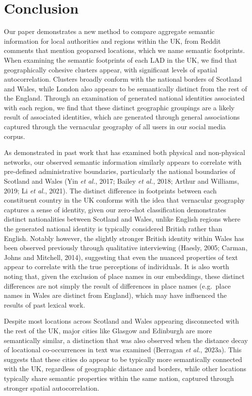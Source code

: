 \documentclass[
  letterpaper,
  11pt,
  english,
  onehalfspacing,
  headsepline]{MastersDoctoralThesis}
\begin{document}
\hypertarget{sec-footconclusion}{%
\section{Conclusion}\label{sec-footconclusion}}

Our paper demonstrates a new method to compare aggregate semantic
information for local authorities and regions within the UK, from Reddit
comments that mention geoparsed locations, which we name semantic
footprints. When examining the semantic footprints of each LAD in the
UK, we find that geographically cohesive clusters appear, with
significant levels of spatial autocorrelation. Clusters broadly conform
with the national borders of Scotland and Wales, while London also
appears to be semantically distinct from the rest of the England.
Through an examination of generated national identities associated with
each region, we find that these distinct geographic groupings are a
likely result of associated identities, which are generated through
general associations captured through the vernacular geography of all
users in our social media corpus.

As demonstrated in past work that has examined both physical and
non-physical networks, our observed semantic information similarly
appears to correlate with pre-defined administrative boundaries,
particularly the national boundaries of Scotland and Wales (Yin \emph{et
al.}, 2017; Bailey \emph{et al.}, 2018; Arthur and Williams, 2019; Li
\emph{et al.}, 2021). The distinct difference in footprints between each
constituent country in the UK conforms with the idea that vernacular
geography captures a sense of identity, given our zero-shot
classification demonstrates distinct nationalities between Scotland and
Wales, unlike English regions where the generated national identity is
typically considered British rather than English. Notably however, the
slightly stronger British identity within Wales has been observed
previously through qualitative interviewing (Haesly, 2005; Carman, Johns
and Mitchell, 2014), suggesting that even the nuanced properties of text
appear to correlate with the true perceptions of individuals. It is also
worth noting that, given the exclusion of place names in our embeddings,
these distinct differences are not simply the result of differences in
place names (e.g.~place names in Wales are distinct from England), which
may have influenced the results of past lexical work.

Despite most locations across Scotland and Wales appearing disconnected
with the rest of the UK, major cities like Glasgow and Edinburgh are
more semantically similar, a distinction that was also observed when the
distance decay of locational co-occurrences in text was examined
(Berragan \emph{et al.}, 2023a). This suggests that these cities do
appear to be typically more semantically connected with the UK,
regardless of geographic distance and borders, while other locations
typically share semantic properties within the same nation, captured
through stronger spatial autocorrelation.
\end{document}
